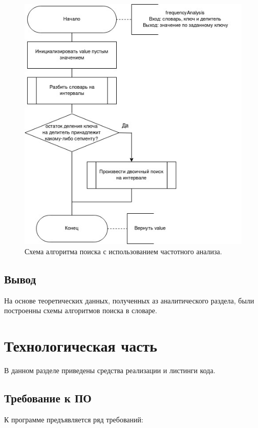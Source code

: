 \documentclass[12pt]{report}
\begin{document}
	\begin{figure}[H]
		\centering
		\includegraphics[scale=1]{freq_analysis.jpg}
		\caption{Схема алгоритма поиска с использованием частотного анализа.}
		\label{fig:mpr}
	\end{figure}
	
	
	\section*{Вывод}
	
	На основе теоретических данных, полученных аз аналитического раздела, были построенны схемы алгоритмов поиска в словаре.
	
	\chapter{Технологическая часть}
	
	В данном разделе приведены средства реализации и листинги кода.
	
	\section{Требование к ПО}
	
	К программе предъявляется ряд требований:
	
\end{document}
